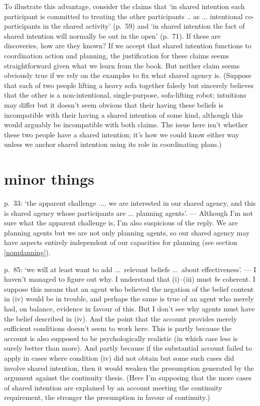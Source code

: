 \documentclass[12pt,letterpaper]{extarticle}
\begin{document}
To illustrate this advantage, consider the claims that `in shared intention each participant is committed to treating the other participants .. as ... intentional co-participants in the shared activity' (p.\ 59) and `in shared intention the fact of shared intention will normally be out in the open' (p.\ 71).
If these are discoveries, how are they known?  
If we accept that  shared intention functions to coordination action and planning, the justification for these claims seems straightforward given what we learn from the book.
But neither claim seems obviously true if we rely on the examples to fix what shared agency is.
(Suppose that each of two people lifting a heavy sofa together falsely but sincerely believes that the other is a non-intentional, single-purpose, sofa-lifting robot; intuitions may differ but it doesn't seem obvious that their having these beliefs is incompatible with their having a shared intention of some kind, although this would arguably be incompatible with both claims.
The issue here isn't whether these two people have a shared intention; it's how we could know either way unless we anchor shared intention using its role in coordinating plans.)




\section{minor things}

p.\ 33: `the apparent challenge .... we are interested in our shared agency, and this is shared agency whose participants are ... planning agents'. --- Although I'm not sure what the apparent challenge is, I'm also suspicious of the reply.  We are planning agents but we are not only planning agents, so our shared agency may have aspects entirely independent of our capacities for planning (see section \vref{nonplanning}).

p.\ 85: `we will at least want to add ...\ relevant beliefs  ...\ about effectiveness'. --- I haven't managed to figure out why.  I understand that (i)--(iii) must \emph{be} coherent.
I suppose this means that an agent who believed the negation of the belief content in (iv) would be in trouble, and perhaps the same is true of an agent who merely had, on balance, evidence in favour of this.
But I don't see why agents must have the belief described in (iv).
And the point that the account provides merely sufficient conditions doesn't seem to work here.
This is partly because the account is also supposed to be psychologically realistic (in which case less is surely better than more).
And partly because if the substantial account failed to  apply in cases where condition (iv) did not obtain but some such cases did involve shared intention, then it would weaken the presumption generated by the argument against the continuity thesis.
(Here I'm supposing that the more cases of shared intention are explained by an account meeting the continuity requirement, the stronger the presumption in favour of continuity.)
\end{document}
